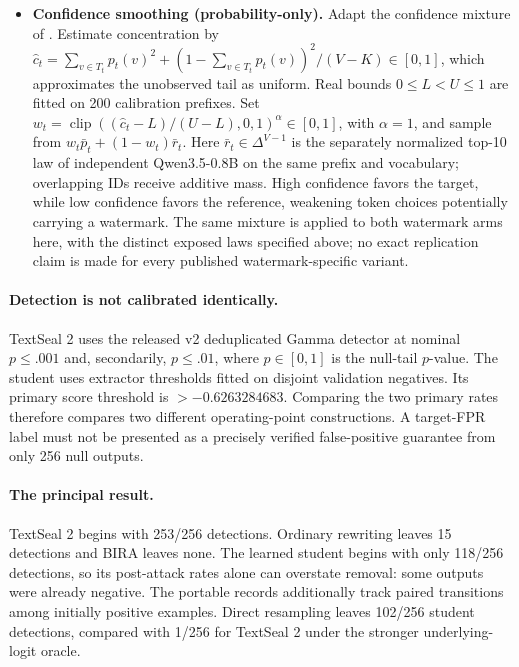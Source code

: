 \begin{itemize}
\item \textbf{Confidence smoothing (probability-only).} Adapt the confidence mixture of \citet{chang2025smoothing}. Estimate concentration by
$\widehat c_t=\sum_{v\in T_t}p_t(v)^2+(1-\sum_{v\in T_t}p_t(v))^2/(V-K)\in[0,1]$,
which approximates the unobserved tail as uniform. Real bounds $0\leq L<U\leq1$ are fitted on 200 calibration prefixes. Set $w_t=\operatorname{clip}((\widehat c_t-L)/(U-L),0,1)^\alpha\in[0,1]$, with $\alpha=1$, and sample from $w_t\bar p_t+(1-w_t)\bar r_t$. Here $\bar r_t\in\Delta^{V-1}$ is the separately normalized top-10 law of independent Qwen3.5-0.8B on the same prefix and vocabulary; overlapping IDs receive additive mass. High confidence favors the target, while low confidence favors the reference, weakening token choices potentially carrying a watermark. The same mixture is applied to both watermark arms here, with the distinct exposed laws specified above; no exact replication claim is made for every published watermark-specific variant.
\end{itemize}

\paragraph{Detection is not calibrated identically.} TextSeal 2 uses the released v2 deduplicated Gamma detector at nominal $p\leq .001$ and, secondarily, $p\leq .01$, where $p\in[0,1]$ is the null-tail $p$-value. The student uses extractor thresholds fitted on disjoint validation negatives. Its primary score threshold is $>-0.6263284683$. Comparing the two primary rates therefore compares two different operating-point constructions. A target-FPR label must not be presented as a precisely verified false-positive guarantee from only 256 null outputs.



\paragraph{The principal result.} TextSeal 2 begins with 253/256 detections. Ordinary rewriting leaves 15 detections and BIRA leaves none. The learned student begins with only 118/256 detections, so its post-attack rates alone can overstate removal: some outputs were already negative. The portable records additionally track paired transitions among initially positive examples. Direct resampling leaves 102/256 student detections, compared with 1/256 for TextSeal 2 under the stronger underlying-logit oracle.

